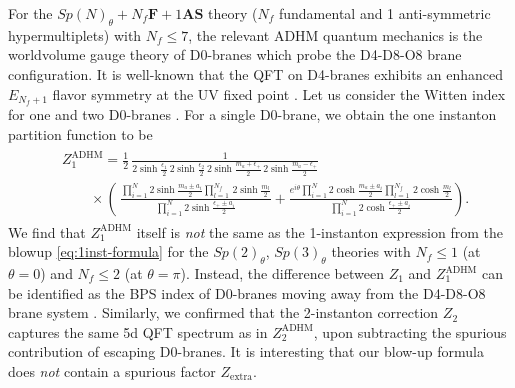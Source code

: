 \documentclass[letterpaper, 11pt]{article}
\def\e{\epsilon}
\begin{document}
{For the $Sp(N)_\theta + N_f \mathbf{F} + 1\mathbf{AS}$ theory ($N_f$ fundamental and 1 anti-symmetric hypermultiplets) with $N_f \leq 7$, the relevant ADHM quantum mechanics is the worldvolume gauge theory of D0-branes which probe the D4-D8-O8 brane configuration. It is well-known that the QFT on D4-branes exhibits an enhanced $E_{N_f + 1}$ flavor symmetry at the UV fixed point \cite{Seiberg:1996bd}. Let us consider the Witten index for one and two D0-branes \cite{Kim:2012gu,Hwang:2014uwa}. For a single D0-brane, we obtain the one instanton partition function to be 
\begin{align}
\begin{split}
&  Z_1^{\text{ADHM}}=\frac{1}{2} \, \frac{1}{2\sinh\frac{\e_1}{2}\,2\sinh\frac{\e_2}{2}\, 2\sinh\frac{m_a+ \e_+}{2} \, 2\sinh\frac{m_a-\e_+}{2}} \\
& \qquad \times\left(\,\frac{\prod_{i=1}^{N}2\sinh\frac{m_a\pm a_i}{2}\prod_{l=1}^{N_f}\,2\sinh\frac{m_l}{2}}{\prod_{i=1}^{N}2\sinh\frac{\e_+\pm a_i}{2}}
  +\frac{e^{i\theta}\prod_{i=1}^{N}2\cosh\frac{m_a\pm a_i}{2}\prod_{l=1}^{N_f}\,2\cosh\frac{m_l}{2}}{ \prod_{i=1}^{N}2\cosh\frac{\e_+\pm a_i}{2}}\right).
\end{split}
\end{align}
We find that $Z_1^{\text{ADHM}}$ itself is \emph{not} the same as the 1-instanton expression from the blowup \eqref{eq:1inst-formula} for the $Sp(2)_\theta$, $Sp(3)_\theta$ theories with $N_f \leq 1$ (at $\theta=0$) and $N_f \leq 2$ (at $\theta=\pi$). Instead, the difference between $Z_1$ and $Z_1^{\text{ADHM}}$ can be identified as the BPS index of D0-branes moving away from the D4-D8-O8 brane system \cite{Kim:2012gu,Hwang:2014uwa}. 
Similarly, we confirmed that the 2-instanton correction $Z_2$ captures the same 5d QFT spectrum as in $Z_2^\text{ADHM}$, upon subtracting the spurious contribution of escaping D0-branes. It is interesting that our blow-up formula does \emph{not} contain a spurious factor $Z_\text{extra}$.


}
\end{document}
